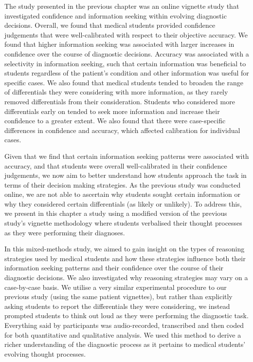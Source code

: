 \documentclass[a4paper, nobind]{templates/ociamthesis}
\begin{document}
The study presented in the previous chapter was an online vignette study that investigated confidence and information seeking within evolving diagnostic decisions. Overall, we found that medical students provided confidence judgements that were well-calibrated with respect to their objective accuracy. We found that higher information seeking was associated with larger increases in confidence over the course of diagnostic decisions. Accuracy was associated with a selectivity in information seeking, such that certain information was beneficial to students regardless of the patient's condition and other information was useful for specific cases. We also found that medical students tended to broaden the range of differentials they were considering with more information, as they rarely removed differentials from their consideration. Students who considered more differentials early on tended to seek more information and increase their confidence to a greater extent. We also found that there were case-specific differences in confidence and accuracy, which affected calibration for individual cases.

\hfill\break
Given that we find that certain information seeking patterns were associated with accuracy, and that students were overall well-calibrated in their confidence judgements, we now aim to better understand how students approach the task in terms of their decision making strategies. As the previous study was conducted online, we are not able to ascertain why students sought certain information or why they considered certain differentials (as likely or unlikely). To address this, we present in this chapter a study using a modified version of the previous study's vignette methodology where students verbalised their thought processes as they were performing their diagnoses.

\hfill\break
In this mixed-methods study, we aimed to gain insight on the types of reasoning strategies used by medical students and how these strategies influence both their information seeking patterns and their confidence over the course of their diagnostic decisions. We also investigated why reasoning strategies may vary on a case-by-case basis. We utilise a very similar experimental procedure to our previous study (using the same patient vignettes), but rather than explicitly asking students to report the differentials they were considering, we instead prompted students to think out loud as they were performing the diagnostic task. Everything said by participants was audio-recorded, transcribed and then coded for both quantitative and qualitative analysis. We used this method to derive a richer understanding of the diagnostic process as it pertains to medical students' evolving thought processes.
\end{document}

